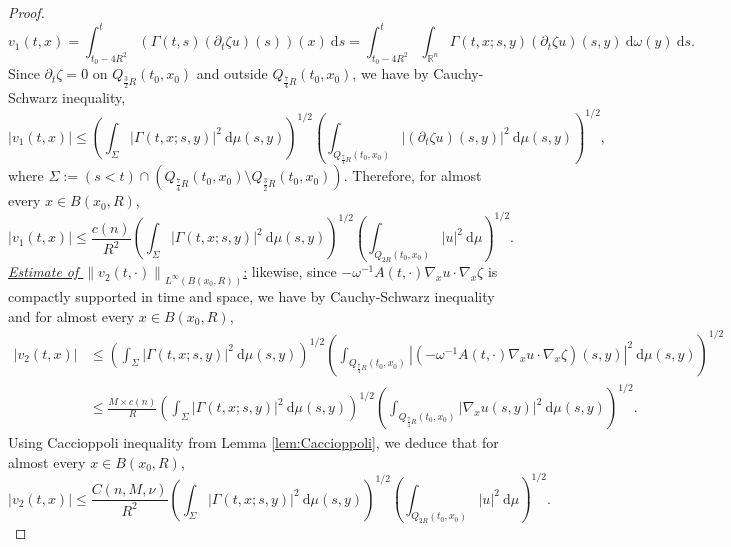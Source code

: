 \documentclass[10pt,a4paper]{amsart}
\begin{document}
\begin{proof}
\begin{equation*}
    v_1(t,x)= \int_{t_0-4R^2}^{t}\left ( \Gamma(t,s)(\partial_t \zeta u)(s) \right )(x) \ \mathrm{d}s = \int_{t_0-4R^2}^{t} \int_{\mathbb{R}^n} \Gamma(t,x;s,y)(\partial_t \zeta u)(s,y) \ \mathrm{d} \omega(y) \ \mathrm ds.
\end{equation*}
Since $\partial_t \zeta = 0 $ on $Q_{\frac{3}{2}R}(t_0,x_0)$ and outside $Q_{\frac{7}{4}R}(t_0,x_0)$, we have by Cauchy-Schwarz inequality, 
\begin{equation*}
    \left | v_1(t,x) \right |\leq \left ( \int_{\Sigma} \left | \Gamma(t,x;s,y) \right |^2 \ \mathrm d\mu(s,y) \right )^{1/2}  \left ( \int_{Q_{\frac{7}{4}R}(t_0,x_0) } \left | (\partial_t \zeta u)(s,y) \right |^2 \ \mathrm d\mu(s,y) \right )^{1/2} ,
\end{equation*}
where $\Sigma:= (s<t)\cap(Q_{\frac{7}{4}R}(t_0,x_0) \setminus Q_{\frac{3}{2}R}(t_0,x_0))$. Therefore, for almost every $x \in B(x_0,R)$,
\begin{equation}\label{1 converse HK}
    \left | v_1(t,x) \right |\leq \frac{c(n)}{R^2}\left ( \int_{\Sigma} \left | \Gamma(t,x;s,y) \right |^2 \ \mathrm d\mu(s,y) \right )^{1/2}  \left ( \int_{Q_{2R}(t_0,x_0) } \left | u \right |^2 \ \mathrm d\mu \right )^{1/2}.
\end{equation}
\underline{\textit{Estimate of $\left\| v_2(t,\cdot) \right\|_{L^\infty(B(x_0,R))}$}:} likewise, since $- \omega^{-1}A(t,\cdot)\nabla_x u \cdot \nabla_x \zeta$ is compactly supported in time and space, we have by Cauchy-Schwarz inequality and for almost every $x \in B(x_0,R)$,
\begin{align*}
    \left | v_2(t,x) \right |&\leq \left ( \int_{\Sigma} \left | \Gamma(t,x;s,y) \right |^2 \ \mathrm d\mu(s,y) \right )^{1/2}  \left ( \int_{Q_{\frac{7}{4}R}(t_0,x_0) } \left | \left ( - \omega^{-1}A(t,\cdot)\nabla_x u \cdot \nabla_x \zeta \right )(s,y) \right |^2 \ \mathrm d\mu(s,y) \right )^{1/2}\\
    &\leq \frac{M \times c(n)}{R} \left ( \int_{\Sigma} \left | \Gamma(t,x;s,y) \right |^2 \ \mathrm d\mu(s,y) \right )^{1/2}  \left ( \int_{Q_{\frac{7}{4}R}(t_0,x_0) } \left | \nabla_x u (s,y) \right |^2 \ \mathrm d\mu(s,y) \right )^{1/2}.
\end{align*}
Using Caccioppoli inequality from Lemma \ref{lem:Caccioppoli}, we deduce that for almost every $x \in B(x_0,R)$,
\begin{equation}\label{2 Convers HK}
    \left | v_2(t,x) \right |\leq \frac{C(n,M,\nu)}{R^2} \left ( \int_{\Sigma} \left | \Gamma(t,x;s,y) \right |^2 \ \mathrm d\mu(s,y) \right )^{1/2}  \left ( \int_{Q_{2R}(t_0,x_0) } \left |  u  \right |^2 \ \mathrm d\mu \right )^{1/2}.

\end{equation}
\end{proof}
\end{document}
